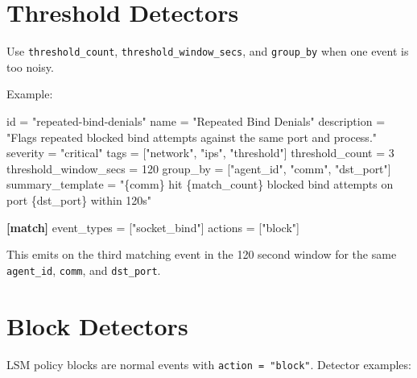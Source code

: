 \documentclass[
  12pt,
]{report}
\newenvironment{Shaded}{}{}
\newcommand{\DataTypeTok}[1]{\textcolor[rgb]{0.56,0.13,0.00}{#1}}
\newcommand{\DecValTok}[1]{\textcolor[rgb]{0.25,0.63,0.44}{#1}}
\newcommand{\KeywordTok}[1]{\textcolor[rgb]{0.00,0.44,0.13}{\textbf{#1}}}
\newcommand{\OperatorTok}[1]{\textcolor[rgb]{0.40,0.40,0.40}{#1}}
\newcommand{\StringTok}[1]{\textcolor[rgb]{0.25,0.44,0.63}{#1}}
\begin{document}
\section{Threshold Detectors}\label{threshold-detectors}

Use \texttt{threshold\_count}, \texttt{threshold\_window\_secs}, and
\texttt{group\_by} when one event is too noisy.

Example:

\begin{Shaded}
\begin{Highlighting}[]
\DataTypeTok{id} \OperatorTok{=} \StringTok{"repeated{-}bind{-}denials"}
\DataTypeTok{name} \OperatorTok{=} \StringTok{"Repeated Bind Denials"}
\DataTypeTok{description} \OperatorTok{=} \StringTok{"Flags repeated blocked bind attempts against the same port and process."}
\DataTypeTok{severity} \OperatorTok{=} \StringTok{"critical"}
\DataTypeTok{tags} \OperatorTok{=} \OperatorTok{[}\StringTok{"network"}\OperatorTok{,} \StringTok{"ips"}\OperatorTok{,} \StringTok{"threshold"}\OperatorTok{]}
\DataTypeTok{threshold\_count} \OperatorTok{=} \DecValTok{3}
\DataTypeTok{threshold\_window\_secs} \OperatorTok{=} \DecValTok{120}
\DataTypeTok{group\_by} \OperatorTok{=} \OperatorTok{[}\StringTok{"agent\_id"}\OperatorTok{,} \StringTok{"comm"}\OperatorTok{,} \StringTok{"dst\_port"}\OperatorTok{]}
\DataTypeTok{summary\_template} \OperatorTok{=} \StringTok{"\{comm\} hit \{match\_count\} blocked bind attempts on port \{dst\_port\} within 120s"}

\KeywordTok{[match]}
\DataTypeTok{event\_types} \OperatorTok{=} \OperatorTok{[}\StringTok{"socket\_bind"}\OperatorTok{]}
\DataTypeTok{actions} \OperatorTok{=} \OperatorTok{[}\StringTok{"block"}\OperatorTok{]}
\end{Highlighting}
\end{Shaded}

This emits on the third matching event in the 120 second window for the
same \texttt{agent\_id}, \texttt{comm}, and \texttt{dst\_port}.

\section{Block Detectors}\label{block-detectors}

LSM policy blocks are normal events with \texttt{action\ =\ "block"}.
Detector examples:
\end{document}
